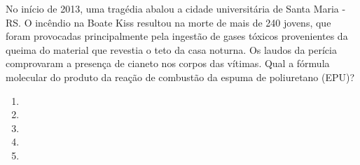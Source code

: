 No início de 2013, uma tragédia abalou a cidade universitária de Santa Maria - RS.
O incêndio na Boate Kiss resultou na morte de mais de 240 jovens, que foram provocadas principalmente pela ingestão de gases tóxicos provenientes da queima do material que revestia o teto da casa noturna.
Os laudos da perícia comprovaram a presença de cianeto nos corpos das vítimas.
Qual a fórmula molecular do produto da reação de combustão da espuma de poliuretano (EPU)?

\begin{enumerate}[label = (\alph*), itemjoin={\quad}]
	\item {}
	\item {}
	\item {}
	\item {}
	\item {}
\end{enumerate}

